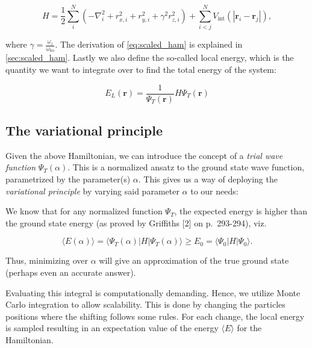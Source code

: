 \documentclass[
]{article}
\begin{document}
\begin{equation} H = \frac{1}{2}\sum_i^N \left(-\nabla_i^2 + r_{x, i}^2 + r_{y, i}^2 + \gamma^2 r_{z, i}^2\right) + \sum_{i<j}^N V_\text{int}(|\mathbf r_i - \mathbf r_j|) ,\label{eq:scaled_ham}\end{equation}

where \(\gamma = \frac{\omega_z}{\omega_\text{ho}}\). The derivation of
\eqref{eq:scaled_ham} is explained in \ref{sec:scaled_ham}. Lastly we
also define the so-called local energy, which is the quantity we want to
integrate over to find the total energy of the system:

\begin{equation} E_L(\mathbf r) = \frac{1}{\Psi_T(\mathbf r)}H\Psi_T(\mathbf r) \label{eq:local-energy}\end{equation}

\hypertarget{the-variational-principle}{%
\subsection{The variational principle}\label{the-variational-principle}}

Given the above Hamiltonian, we can introduce the concept of a
\emph{trial wave function} \(\Psi_T(\alpha)\). This is a normalized
ansatz to the ground state wave function, parametrized by the
parameter(s) \(\alpha\). This gives us a way of deploying the
\emph{variational principle} by varying said parameter \(\alpha\) to our
needs:

We know that for any normalized function \(\Psi_T\), the expected energy
is higher than the ground state energy (as proved by Griffiths {[}2{]}
on p.~293-294), viz.

\begin{equation} \langle E(\alpha) \rangle = \langle \Psi_T(\alpha) | H | \Psi_T(\alpha)\rangle \ge E_0 = \langle \Psi_0 | H | \Psi_0\rangle. \label{eq:variational-principle}\end{equation}

Thus, minimizing over \(\alpha\) will give an approximation of the true
ground state (perhaps even an accurate answer).

Evaluating this integral is computationally demanding. Hence, we utilize
Monte Carlo integration to allow scalability. This is done by changing
the particles positions where the shifting follows some rules. For each
change, the local energy is sampled resulting in an expectation value of
the energy \(\langle E\rangle\) for the Hamiltonian.
\end{document}
